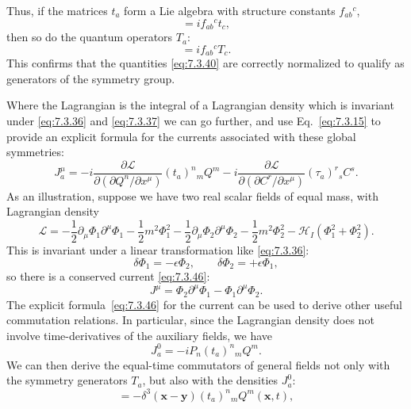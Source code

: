 Thus, if the matrices $t_a$ form a Lie algebra with structure constants
$f_{ab}{}^c$,
\begin{equation}
[t_a,t_b] =if_{ab}{}^ct_c,
\tag{7.3.44}\label{eq:7.3.44}
\end{equation}
then so do the quantum operators $T_a$:
\begin{equation}
[T_a,T_b] =if_{ab}{}^cT_c.
\tag{7.3.45}\label{eq:7.3.45}
\end{equation}
This confirms that the quantities \eqref{eq:7.3.40} are correctly normalized to qualify
as generators of the symmetry group.

Where the Lagrangian is the integral of a Lagrangian density which is invariant
under \eqref{eq:7.3.36} and \eqref{eq:7.3.37} we can go further, and use Eq.~\eqref{eq:7.3.15} to provide
an explicit formula for the currents associated with these global symmetries:
\begin{equation}
J_a^\mu=-i\frac{\partial\mathcal{L}}
{\partial(\partial Q^n/\partial x^\mu)}(t_a)^n{}_mQ^m
-i\frac{\partial\mathcal{L}}
{\partial(\partial C^r/\partial x^\mu)}(\tau_a)^r{}_sC^s.
\tag{7.3.46}\label{eq:7.3.46}
\end{equation}
As an illustration, suppose we have two real scalar fields of equal mass, with
Lagrangian density
\begin{equation}
\mathcal{L}=-\frac12\partial_\mu\Phi_1\partial^\mu\Phi_1
-\frac12m^2\Phi_1^2
-\frac12\partial_\mu\Phi_2\partial^\mu\Phi_2
-\frac12m^2\Phi_2^2-\mathcal{H}_I(\Phi_1^2+\Phi_2^2).
\tag{7.3.47}\label{eq:7.3.47}
\end{equation}
This is invariant under a linear transformation like \eqref{eq:7.3.36}:
\[
\delta\Phi_1=-\epsilon\Phi_2,
\qquad
\delta\Phi_2=+\epsilon\Phi_1,
\]
so there is a conserved current \eqref{eq:7.3.46}:
\[
J^\mu=\Phi_2\partial^\mu\Phi_1-\Phi_1\partial^\mu\Phi_2.
\]
The explicit formula~\eqref{eq:7.3.46} for the current can be used to derive other
useful commutation relations. In particular, since the Lagrangian density does
not involve time-derivatives of the auxiliary fields, we have
\begin{equation}
J_a^0=-iP_n(t_a)^n{}_mQ^m.
\tag{7.3.48}\label{eq:7.3.48}
\end{equation}
We can then derive the equal-time commutators of general fields not only with
the symmetry generators $T_a$, but also with the densities $J_a^0$:
\begin{equation}
[J_a^0(\mathbf{x},t),Q^n(\mathbf{y},t)]
=-\delta^3(\mathbf{x}-\mathbf{y})(t_a)^n{}_mQ^m(\mathbf{x},t),
\tag{7.3.49}\label{eq:7.3.49}
\end{equation}
